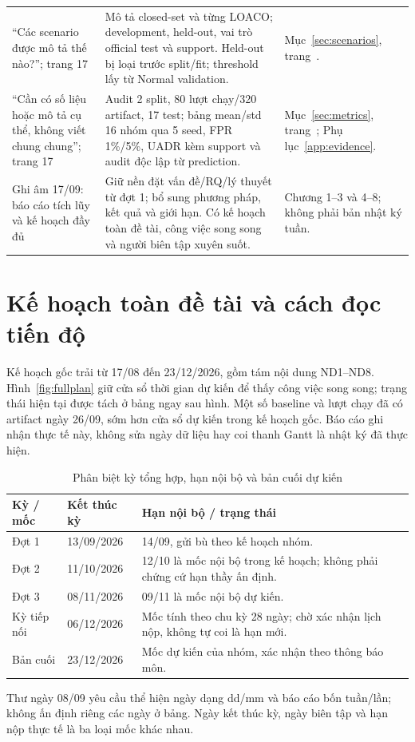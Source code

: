 \documentclass[12pt,a4paper,oneside]{report}
\begin{document}
\begin{longtable}{L{3.4cm}L{8.2cm}L{4.1cm}}
``Các scenario được mô tả thế nào?''; trang 17 & Mô tả closed-set và từng LOACO; development, held-out, vai trò official test và support. Held-out bị loại trước split/fit; threshold lấy từ Normal validation. & Mục~\ref{sec:scenarios}, trang~\pageref{sec:scenarios}.\\
``Cần có số liệu hoặc mô tả cụ thể, không viết chung chung''; trang 17 & Audit 2 split, 80 lượt chạy/320 artifact, 17 test; bảng mean/std 16 nhóm qua 5 seed, FPR 1\%/5\%, UADR kèm support và audit độc lập từ prediction. & Mục~\ref{sec:metrics}, trang~\pageref{sec:metrics}; Phụ lục~\ref{app:evidence}.\\
Ghi âm 17/09: báo cáo tích lũy và kế hoạch đầy đủ & Giữ nền đặt vấn đề/RQ/lý thuyết từ đợt 1; bổ sung phương pháp, kết quả và giới hạn. Có kế hoạch toàn đề tài, công việc song song và người biên tập xuyên suốt. & Chương 1--3 và 4--8; không phải bản nhật ký tuần.\\
\bottomrule\end{longtable}\endgroup

\section{Kế hoạch toàn đề tài và cách đọc tiến độ}\label{sec:progress}
Kế hoạch gốc trải từ 17/08 đến 23/12/2026, gồm tám nội dung ND1--ND8. Hình~\ref{fig:fullplan} giữ cửa sổ thời gian dự kiến để thấy công việc song song; trạng thái hiện tại được tách ở bảng ngay sau hình. Một số baseline và lượt chạy đã có artifact ngày 26/09, sớm hơn cửa sổ dự kiến trong kế hoạch gốc. Báo cáo ghi nhận thực tế này, không sửa ngày dữ liệu hay coi thanh Gantt là nhật ký đã thực hiện.



\begin{table}[H]\centering\small
\caption{Phân biệt kỳ tổng hợp, hạn nội bộ và bản cuối dự kiến}
\begin{tabularx}{\textwidth}{L{2.0cm}L{3.8cm}Y}\toprule
Kỳ / mốc & Kết thúc kỳ & Hạn nội bộ / trạng thái\\\midrule
Đợt 1 & 13/09/2026 & 14/09, gửi bù theo kế hoạch nhóm.\\
Đợt 2 & 11/10/2026 & 12/10 là mốc nội bộ trong kế hoạch; không phải chứng cứ hạn thầy ấn định.\\
Đợt 3 & 08/11/2026 & 09/11 là mốc nội bộ dự kiến.\\
Kỳ tiếp nối & 06/12/2026 & Mốc tính theo chu kỳ 28 ngày; chờ xác nhận lịch nộp, không tự coi là hạn mới.\\
Bản cuối & 23/12/2026 & Mốc dự kiến của nhóm, xác nhận theo thông báo môn.\\
\bottomrule\end{tabularx}\end{table}
Thư ngày 08/09 yêu cầu thể hiện ngày dạng dd/mm và báo cáo bốn tuần/lần; không ấn định riêng các ngày ở bảng. Ngày kết thúc kỳ, ngày biên tập và hạn nộp thực tế là ba loại mốc khác nhau.
\end{document}
